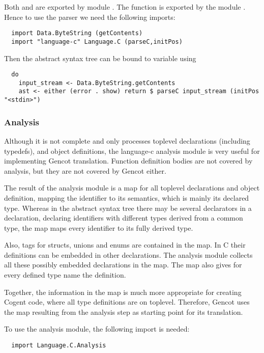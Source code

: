 Both  and  are exported by module . The function 
is exported by the module . Hence to use the parser we need the following imports:
\begin{verbatim}
  import Data.ByteString (getContents)
  import "language-c" Language.C (parseC,initPos)
\end{verbatim}

Then the abstract syntax tree can be bound to variable  using
\begin{verbatim}
  do
    input_stream <- Data.ByteString.getContents
    ast <- either (error . show) return $ parseC input_stream (initPos "<stdin>")
\end{verbatim}

\subsubsection{Analysis}

Although it is not complete and only processes toplevel declarations (including typedefs), and object definitions, the
language-c analysis module is very
useful for implementing Gencot translation. Function definition bodies are not covered by analysis, but they are
not covered by Gencot either.

The result of the analysis module is a map for all toplevel declarations and object definition, mapping the identifier
to its semantics, which is mainly its declared type. Whereas in the abstract syntax tree there may be several declarators
in a declaration, declaring identifiers with different types derived from a common type, the map maps every identifier
to its fully derived type. 

Also, tags for structs, unions and enums are contained in the map. In C their definitions can be embedded in other declarations.
The analysis module collects all these possibly embedded declarations in the map. The map also gives for every defined type name
the definition.

Together, the information in the map is much more appropriate for creating Cogent code, where all type definitions are on
toplevel. Therefore, Gencot uses the map resulting from the analysis step as starting point for its translation.

To use the analysis module, the following import is needed:
\begin{verbatim}
  import Language.C.Analysis
\end{verbatim}

